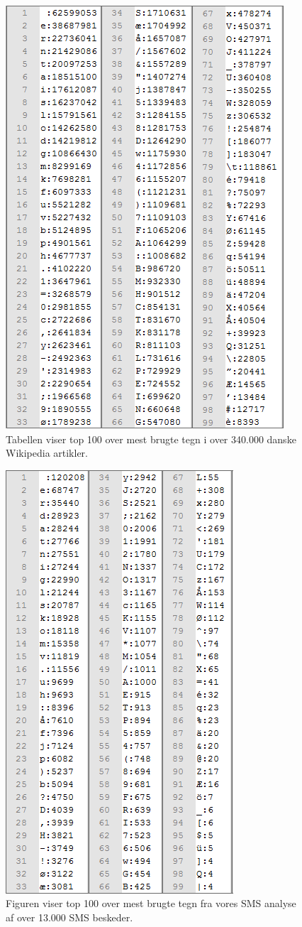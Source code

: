 \begin{figure}[H]
\centering
\includegraphics []{Billeder/wikiBilag.png}
\caption {Tabellen viser top 100 over mest brugte tegn i over 340.000 danske Wikipedia artikler.}
\label {wikiAnalyse}
\end{figure}

\begin{figure}[H]
\centering
\includegraphics []{Billeder/SMSbilag.png}
\caption {Figuren viser top 100 over mest brugte tegn fra vores SMS analyse af over 13.000 SMS beskeder.}
\label {SMSanalyse}
\end{figure}

